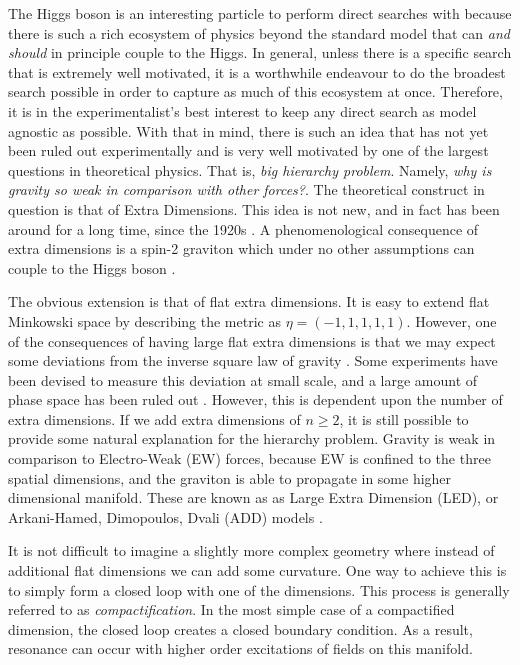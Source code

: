 \documentclass[12pt]{article}
\begin{document}
The Higgs boson is an interesting particle to perform direct searches with
because there is such a rich ecosystem of physics beyond the standard model that
can \textit{and should} in principle couple to the Higgs. In general, unless
there is a specific search that is extremely well motivated, it is a worthwhile
endeavour to do the broadest search possible in order to capture as much of this
ecosystem at once. Therefore, it is in the experimentalist's best interest to
keep any direct search as model agnostic as possible. With that in mind, there
is such an idea that has not yet been ruled out experimentally and is very well
motivated by one of the largest questions in theoretical physics. That is,
\textit{big hierarchy problem}. Namely, \textit{why is gravity so weak in
comparison with other forces?}. The theoretical construct in question is that of
Extra Dimensions. This idea is not new, and in fact has been around for a long
time, since the 1920s \cite{KALUZA_2018}. A phenomenological consequence of extra
dimensions is a spin-2 graviton which under no other assumptions can couple to
the Higgs boson \cite{bsm}.  

The obvious extension is that of flat extra dimensions. It is easy to extend
flat Minkowski space by describing the metric as $\eta = (-1,1,1,1,1)$. However,
one of the consequences of having large flat extra dimensions is that we may
expect some deviations from the inverse square law of gravity \cite{bsm}. Some
experiments have been devised to measure this deviation at small scale, and a
large amount of phase space has been ruled out \cite{bsm}. However, this is
dependent upon the number of extra dimensions. If we add extra dimensions of
$n\geq 2$, it is still possible to provide some natural explanation for the
hierarchy problem. Gravity is weak in comparison to Electro-Weak (EW) forces,
because EW is confined to the three spatial dimensions, and the graviton is able
to propagate in some higher dimensional manifold. These are known as as Large
Extra Dimension (LED), or Arkani-Hamed, Dimopoulos, Dvali (ADD) models
\cite{Arkani_Hamed_1998, Arkani_Hamed_1999}. 

It is not difficult to imagine a slightly more complex geometry where instead of
additional flat dimensions we can add some curvature. One way to achieve this is
to simply form a closed loop with one of the dimensions. This process is
generally referred to as \textit{compactification}. In the most simple case of a
compactified dimension, the closed loop creates a closed boundary condition. As
a result, resonance can occur with higher order excitations of fields on this
manifold. 
\end{document}
